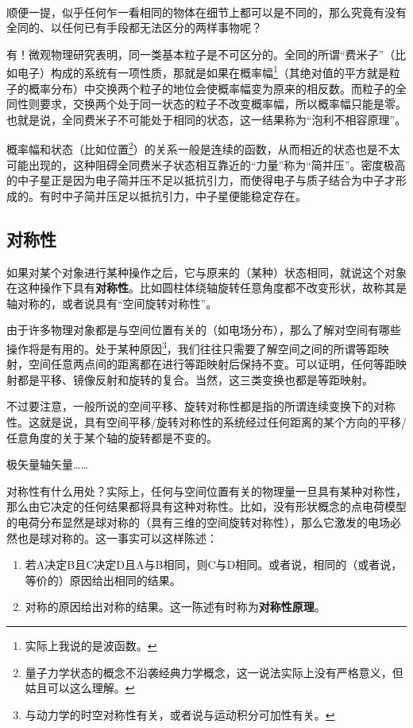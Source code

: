 \documentclass[10pt]{article}
\begin{document}
				~{}\\

				顺便一提，似乎任何乍一看相同的物体在细节上都可以是不同的，那么究竟有没有全同的、以任何已有手段都无法区分的两样事物呢？
				
				有！微观物理研究表明，同一类基本粒子是不可区分的。全同的所谓“费米子”（比如电子）构成的系统有一项性质，那就是如果在概率幅\footnote{实际上我说的是波函数。}（其绝对值的平方就是粒子的概率分布）中交换两个粒子的地位会使概率幅变为原来的相反数。而粒子的全同性则要求，交换两个处于同一状态的粒子不改变概率幅，所以概率幅只能是零。也就是说，全同费米子不可能处于相同的状态，这一结果称为“泡利不相容原理”。
				
				概率幅和状态（比如位置\footnote{量子力学状态的概念不沿袭经典力学概念，这一说法实际上没有严格意义，但姑且可以这么理解。}）的关系一般是连续的函数，从而相近的状态也是不太可能出现的，这种阻碍全同费米子状态相互靠近的“力量”称为“简并压”。密度极高的中子星正是因为电子简并压不足以抵抗引力，而使得电子与质子结合为中子才形成的。有时中子简并压足以抵抗引力，中子星便能稳定存在。

			\subsection{对称性}
				如果对某个对象进行某种操作之后，它与原来的（某种）状态相同，就说这个对象在这种操作下具有\textbf{对称性}。比如圆柱体绕轴旋转任意角度都不改变形状，故称其是轴对称的，或者说具有“空间旋转对称性”。

				由于许多物理对象都是与空间位置有关的（如电场分布），那么了解对空间有哪些操作将是有用的。处于某种原因\footnote{与动力学的时空对称性有关，或者说与运动积分可加性有关。}，我们往往只需要了解空间之间的所谓等距映射，空间任意两点间的距离都在进行等距映射后保持不变。可以证明，任何等距映射都是平移、镜像反射和旋转的复合。当然，这三类变换也都是等距映射。
				
				不过要注意，一般所说的空间平移、旋转对称性都是指的所谓连续变换下的对称性。这就是说，具有空间平移/旋转对称性的系统经过任何距离的某个方向的平移/任意角度的关于某个轴的旋转都是不变的。

				极矢量轴矢量……

				对称性有什么用处？实际上，任何与空间位置有关的物理量一旦具有某种对称性，那么由它决定的任何结果都将具有这种对称性。比如，没有形状概念的点电荷模型的电荷分布显然是球对称的（具有三维的空间旋转对称性），那么它激发的电场必然也是球对称的。这一事实可以这样陈述：

				\begin{enumerate}
					\item 若A决定B且C决定D且A与B相同，则C与D相同。或者说，相同的（或者说，等价的）原因给出相同的结果。
					\item 对称的原因给出对称的结果。这一陈述有时称为\textbf{对称性原理}。
				\end{enumerate}
\end{document}
